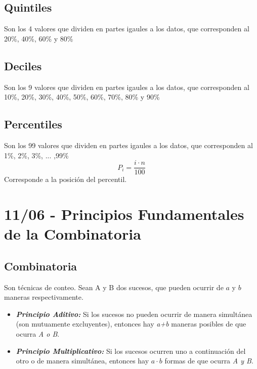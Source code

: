 \documentclass[12pt, letterpaper]{article}
\begin{document}
\subsection{Quintiles}
Son los 4 valores que dividen en partes igaules a los datos, que corresponden al 20\%, 40\%, 60\% y 80\%

\subsection{Deciles}
Son los 9 valores que dividen en partes igaules a los datos, que corresponden al 10\%, 20\%, 30\%, 40\%, 50\%, 60\%, 70\%, 80\% y 90\%


\subsection{Percentiles}
Son los 99 valores que dividen en partes igaules a los datos, que corresponden al 1\%, 2\%, 3\%, ... ,99\%
\[ P_i= \frac{i \cdot n}{100} \] Corresponde a la posición del percentil.


\newpage

\section{11/06 - Principios Fundamentales de la Combinatoria}
\subsection{Combinatoria} 
Son técnicas de conteo. Sean A y B dos sucesos, que pueden ocurrir de $a$ y $b$ maneras respectivamente.
\begin{itemize}
    \item \textbf{\textit{Principio Aditivo:}} Si los sucesos no pueden ocurrir de manera simultánea (son mutuamente excluyentes), entonces hay \textit{a+b} maneras posibles de que ocurra \textit{A o B}.
    \item \textbf{\textit{Principio Multiplicativo:}} Si los sucesos ocurren uno a continuación del otro o de manera simultánea, entonces hay $a \cdot b$ formas de que ocurra \textit{A y B}.
\end{itemize}
\end{document}
